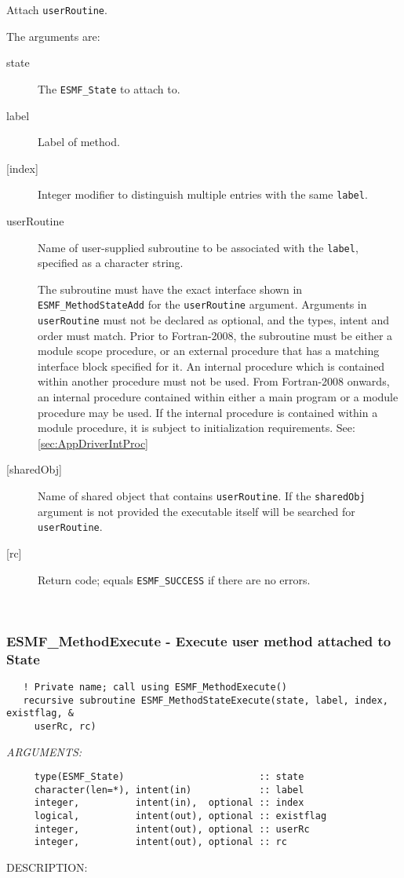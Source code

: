    Attach {\tt userRoutine}.
  
   The arguments are:
   \begin{description}
   \item[state]
     The {\tt ESMF\_State} to attach to.
   \item[label]
     Label of method.
   \item[{[index]}]
     Integer modifier to distinguish multiple entries with the same {\tt label}.
   \item[userRoutine]
     Name of user-supplied subroutine to be associated with the {\tt label},
     specified as a character string.
  
     The subroutine must have the exact interface shown in {\tt ESMF\_MethodStateAdd}
     for the {\tt userRoutine} argument. Arguments in {\tt userRoutine}
     must not be declared as optional, and the types, intent and order must
     match.
     Prior to Fortran-2008, the subroutine must be either a module scope procedure,
     or an external procedure that has a matching interface block specified for it.
     An internal procedure which is contained within another procedure must not be used.
     From Fortran-2008 onwards, an internal procedure contained within either a main program
     or a module procedure may be used.  If the internal procedure is contained within a
     module procedure, it is subject to initialization requirements.  See: \ref{sec:AppDriverIntProc}
 
   \item[{[sharedObj]}]
     Name of shared object that contains {\tt userRoutine}. If the
     {\tt sharedObj} argument is not provided the executable itself will be
     searched for {\tt userRoutine}.
   \item[{[rc]}]
     Return code; equals {\tt ESMF\_SUCCESS} if there are no errors.
   \end{description}
   
 
\mbox{}\hrulefill\ 
 
\subsubsection [ESMF\_MethodExecute] {ESMF\_MethodExecute - Execute user method attached to State}


  
\begin{verbatim}   ! Private name; call using ESMF_MethodExecute()
   recursive subroutine ESMF_MethodStateExecute(state, label, index, existflag, &
     userRc, rc)\end{verbatim}{\em ARGUMENTS:}
\begin{verbatim}     type(ESMF_State)                        :: state
     character(len=*), intent(in)            :: label
     integer,          intent(in),  optional :: index
     logical,          intent(out), optional :: existflag
     integer,          intent(out), optional :: userRc
     integer,          intent(out), optional :: rc\end{verbatim}
{\sf DESCRIPTION:\\ }


